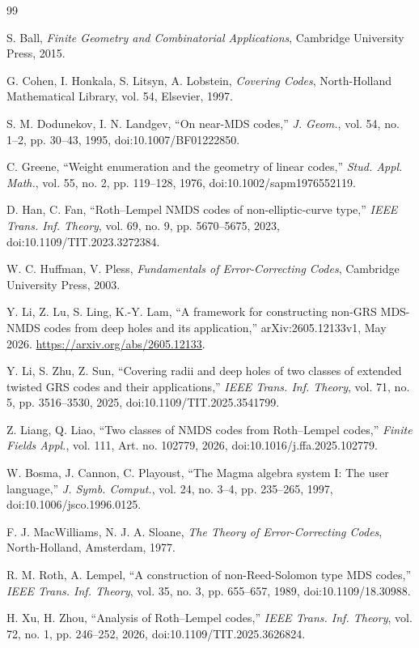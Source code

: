 \documentclass[11pt]{article}
\theoremstyle{plain}
\theoremstyle{definition}
\begin{document}
\begin{thebibliography}{99}

S. Ball,
\emph{Finite Geometry and Combinatorial Applications},
Cambridge University Press, 2015.

G. Cohen, I. Honkala, S. Litsyn, A. Lobstein,
\emph{Covering Codes},
North-Holland Mathematical Library, vol. 54, Elsevier, 1997.

S. M. Dodunekov, I. N. Landgev,
``On near-MDS codes,''
\emph{J. Geom.}, vol. 54, no. 1--2, pp. 30--43, 1995,
doi:10.1007/BF01222850.

C. Greene,
``Weight enumeration and the geometry of linear codes,''
\emph{Stud. Appl. Math.}, vol. 55, no. 2, pp. 119--128, 1976,
doi:10.1002/sapm1976552119.

D. Han, C. Fan,
``Roth--Lempel NMDS codes of non-elliptic-curve type,''
\emph{IEEE Trans. Inf. Theory}, vol. 69, no. 9, pp. 5670--5675, 2023,
doi:10.1109/TIT.2023.3272384.

W. C. Huffman, V. Pless,
\emph{Fundamentals of Error-Correcting Codes},
Cambridge University Press, 2003.

Y. Li, Z. Lu, S. Ling, K.-Y. Lam,
``A framework for constructing non-GRS MDS-NMDS codes from deep holes and its application,''
arXiv:2605.12133v1, May 2026. \url{https://arxiv.org/abs/2605.12133}.

Y. Li, S. Zhu, Z. Sun,
``Covering radii and deep holes of two classes of extended twisted GRS codes
and their applications,''
\emph{IEEE Trans. Inf. Theory}, vol. 71, no. 5, pp. 3516--3530, 2025,
doi:10.1109/TIT.2025.3541799.

Z. Liang, Q. Liao,
``Two classes of NMDS codes from Roth--Lempel codes,''
\emph{Finite Fields Appl.}, vol. 111, Art. no. 102779, 2026,
doi:10.1016/j.ffa.2025.102779.

W. Bosma, J. Cannon, C. Playoust,
``The Magma algebra system I: The user language,''
\emph{J. Symb. Comput.}, vol. 24, no. 3--4, pp. 235--265, 1997,
doi:10.1006/jsco.1996.0125.

F. J. MacWilliams, N. J. A. Sloane,
\emph{The Theory of Error-Correcting Codes},
North-Holland, Amsterdam, 1977.

R. M. Roth, A. Lempel,
``A construction of non-Reed-Solomon type MDS codes,''
\emph{IEEE Trans. Inf. Theory}, vol. 35, no. 3, pp. 655--657, 1989,
doi:10.1109/18.30988.

H. Xu, H. Zhou,
``Analysis of Roth--Lempel codes,''
\emph{IEEE Trans. Inf. Theory}, vol. 72, no. 1, pp. 246--252, 2026,
doi:10.1109/TIT.2025.3626824.

\end{thebibliography}
\end{document}
